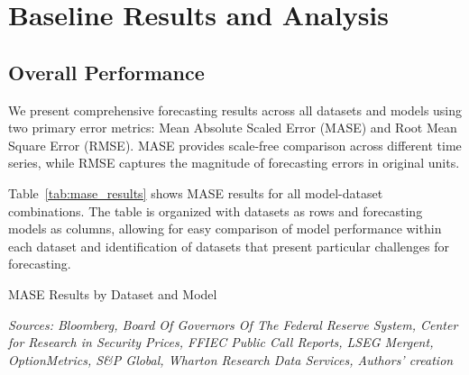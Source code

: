 \documentclass{article}
\begin{document}
\section{Baseline Results and Analysis}
\label{sec:results}


\subsection{Overall Performance}

We present comprehensive forecasting results across all datasets and models using two primary error metrics: Mean Absolute Scaled Error (MASE) and Root Mean Square Error (RMSE). MASE provides scale-free comparison across different time series, while RMSE captures the magnitude of forecasting errors in original units.

Table~\ref{tab:mase_results} shows MASE results for all model-dataset combinations. The table is organized with datasets as rows and forecasting models as columns, allowing for easy comparison of model performance within each dataset and identification of datasets that present particular challenges for forecasting.

\begin{table}[htbp]
\centering
\caption{MASE Results by Dataset and Model}
\label{tab:mase_results}

\caption*{
\scriptsize
\emph{Sources: Bloomberg, Board Of Governors Of The Federal Reserve System, Center for Research in Security Prices, FFIEC Public Call Reports, LSEG Mergent, OptionMetrics, S\&P Global, Wharton Research Data Services, Authors' creation}}
\end{table}

\end{document}
